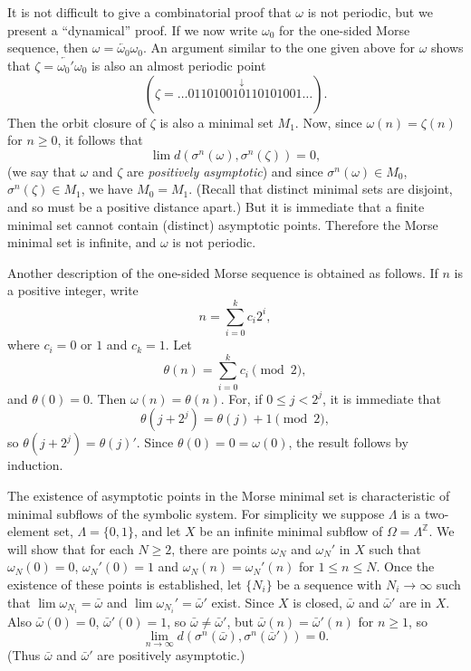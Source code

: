It is not difficult to give a combinatorial proof that $\omega$ is not periodic, but we present a “dynamical” proof. If we now write $\omega_0$ for the one-sided Morse sequence, then $\omega = \overleftarrow{\omega_0}\omega_0$. An argument similar to the one given above for $\omega$ shows that $\zeta = \overleftarrow{\omega_0'}\omega_0$ is also an almost periodic point
\[
    (\zeta = \ldots 01101001\overset{\downarrow}{0}110101001\ldots).
\]
Then the orbit closure of $\zeta$ is also a minimal set $M_1$. Now, since $\omega(n) = \zeta(n)$ for $n \ge 0$, it follows that
\[
    \lim d(\sigma^n(\omega), \sigma^n(\zeta)) = 0,
\]
(we say that $\omega$ and $\zeta$ are \textit{positively asymptotic}) and since $\sigma^n(\omega) \in M_0$, $\sigma^n(\zeta) \in M_1$, we have $M_0 = M_1$. (Recall that distinct minimal sets are disjoint, and so must be a positive distance apart.) But it is immediate that a finite minimal set cannot contain (distinct) asymptotic points. Therefore the Morse minimal set is infinite, and $\omega$ is not periodic.

Another description of the one-sided Morse sequence is obtained as follows. If $n$ is a positive integer, write
\[
    n = \sum_{i=0}^{k} c_i 2^i,
\]
where $c_i = 0$ or $1$ and $c_k = 1$. Let
\[
    \theta(n) = \sum_{i=0}^{k} c_i \pmod{2},
\]
and $\theta(0) = 0$. Then $\omega(n) = \theta(n)$. For, if $0 \le j < 2^j$, it is immediate that
\[
    \theta(j + 2^j) = \theta(j) + 1 \pmod{2},
\]
so $\theta(j + 2^j) = \theta(j)'$. Since $\theta(0) = 0 = \omega(0)$, the result follows by induction.

The existence of asymptotic points in the Morse minimal set is characteristic of minimal subflows of the symbolic system. For simplicity we suppose $\Lambda$ is a two-element set, $\Lambda = \{0,1\}$, and let $X$ be an infinite minimal subflow of $\Omega = \Lambda^{\mathbb{Z}}$. We will show that for each $N \ge 2$, there are points $\omega_N$ and $\omega_N'$ in $X$ such that $\omega_N(0) = 0$, $\omega_N'(0) = 1$ and $\omega_N(n) = \omega_N'(n)$ for $1 \le n \le N$. Once the existence of these points is established, let $\{N_i\}$ be a sequence with $N_i \to \infty$ such that $\lim \omega_{N_i} = \bar{\omega}$ and $\lim \omega_{N_i}' = \bar{\omega}'$ exist. Since $X$ is closed, $\bar{\omega}$ and $\bar{\omega}'$ are in $X$. Also $\bar{\omega}(0) = 0$, $\bar{\omega}'(0) = 1$, so $\bar{\omega} \ne \bar{\omega}'$, but $\bar{\omega}(n) = \bar{\omega}'(n)$ for $n \ge 1$, so
\[
    \lim_{n \to \infty} d(\sigma^n(\bar{\omega}), \sigma^n(\bar{\omega}')) = 0.
\]
(Thus $\bar{\omega}$ and $\bar{\omega}'$ are positively asymptotic.)

